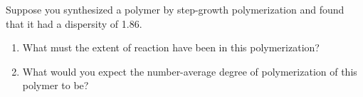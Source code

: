\begin{activity}
\begin{ctqs}
			
\end{ctqs}

\begin{exercises}

		\exercise Suppose you synthesized a polymer by step-growth polymerization and found that it had a dispersity of 1.86.
		
			\begin{enumerate}
				\item What must the extent of reaction have been in this polymerization?
		
					\begin{solution}%
					\end{solution}
					
				\item What would you expect the number-average degree of polymerization of this polymer to be?
		
					\begin{solution}%
					\end{solution}
			\end{enumerate}
\end{exercises}
	
\end{activity}